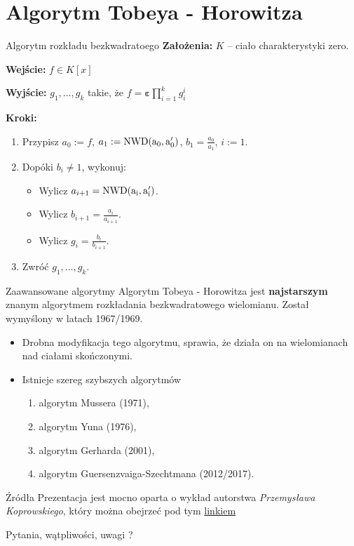 \documentclass{beamer}
\newcommand{\NWD}{\rm{NWD}}
\renewcommand{\epsilon}{\bm{\varepsilon}}
\begin{document}
\section{Algorytm Tobeya - Horowitza}
\begin{frame}{Algorytm rozkładu bezkwadratoego}
    \textbf{Założenia:} $K$ -- ciało charakterystyki zero. 

    \textbf{Wejście:} $f \in K[x]$

    \textbf{Wyjście:} $g_1,\ldots, g_k$ takie, że $f = \epsilon \prod_{i=1}^{k}g_i^i$
    
    \textbf{Kroki:}
    \begin{enumerate}
        \item Przypisz $a_0 := f$, $a_1 := \NWD(a_0, a_0')$, $b_1 = \frac{a_0}{a_1}$, $i:=1$. 
        \item Dopóki $b_i \neq 1$, wykonuj:
        \begin{itemize}
            \item Wylicz $a_{i+1} = \NWD(a_i, a_i')$.
            \item Wylicz $b_{i+1} = \frac{a_{i}}{a_{i+1}}$.
            \item Wylicz $g_i = \frac{b_i}{b_{i+1}}$.
        \end{itemize}
        \item Zwróć $g_1, \ldots, g_k$. 
    \end{enumerate}
\end{frame}

\begin{frame}{Zaawansowane algorytmy}
    Algorytm Tobeya - Horowitza jest \textbf{najstarszym} znanym algorytmem rozkładania bezkwadratowego wielomianu.
    Został wymyślony w latach 1967/1969. 
    \pause 
    \begin{itemize}
        \item Drobna modyfikacja tego algorytmu, sprawia, że działa on na wielomianach nad ciałami skończonymi. 
        \pause \item Istnieje szereg szybszych algorytmów \begin{enumerate}
            \item algorytm Mussera (1971),
            \item algorytm Yuna (1976),
            \item algorytm Gerharda (2001),
            \item algorytm Guersenzvaiga-Szechtmana (2012/2017).
        \end{enumerate}
    \end{itemize}
\end{frame}

\begin{frame}{Źródła}
    Prezentacja jest mocno oparta o wykład autorstwa \textit{Przemysława Koprowskiego}, który można obejrzeć pod tym 
    \href{https://www.youtube.com/watch?v=x8AMniwrD4s&t=3373s}{linkiem}
    \printbibliography
\end{frame}

\begin{frame}
    \centering 
    \LARGE Pytania, wątpliwości, uwagi ? 
\end{frame}
\end{document}
